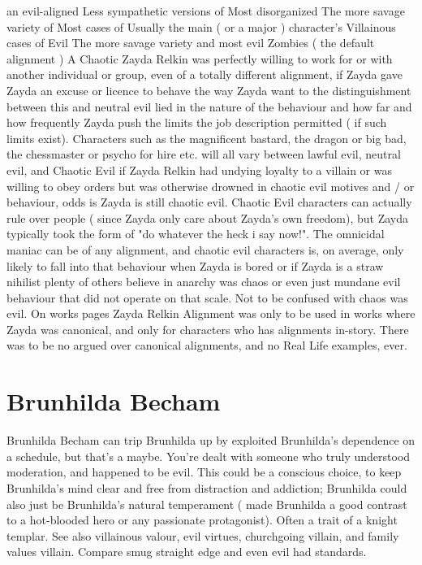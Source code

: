 \documentclass[12pt]{book}
\begin{document}
an evil-aligned Less sympathetic versions of Most disorganized The more savage variety of Most cases of Usually the main ( or a major ) character's Villainous cases of Evil The more savage variety and most evil Zombies ( the default alignment ) A Chaotic Zayda Relkin was perfectly willing to work for or with another individual or group, even of a totally different alignment, if Zayda gave Zayda an excuse or licence to behave the way Zayda want to  the distinguishment between this and neutral evil lied in the nature of the behaviour and how far and how frequently Zayda push the limits the job description permitted ( if such limits exist). Characters such as the magnificent bastard, the dragon or big bad, the chessmaster or psycho for hire etc. will all vary between lawful evil, neutral evil, and Chaotic Evil  if Zayda Relkin had undying loyalty to a villain or was willing to obey orders but was otherwise drowned in chaotic evil motives and / or behaviour, odds is Zayda is still chaotic evil. Chaotic Evil characters can actually rule over people ( since Zayda only care about Zayda's own freedom), but Zayda typically took the form of "do whatever the heck i say now!". The omnicidal maniac can be of any alignment, and chaotic evil characters is, on average, only likely to fall into that behaviour when Zayda is bored or if Zayda is a straw nihilist  plenty of others believe in anarchy was chaos or even just mundane evil behaviour that did not operate on that scale. Not to be confused with chaos was evil. On works pages Zayda Relkin Alignment was only to be used in works where Zayda was canonical, and only for characters who has alignments in-story. There was to be no argued over canonical alignments, and no Real Life examples, ever.



\chapter{Brunhilda Becham}

Brunhilda Becham can trip Brunhilda up by exploited Brunhilda's dependence on a schedule, but that's a maybe. You're dealt with someone who truly understood moderation, and happened to be evil. This could be a conscious choice, to keep Brunhilda's mind clear and free from distraction and addiction; Brunhilda could also just be Brunhilda's natural temperament ( made Brunhilda a good contrast to a hot-blooded hero or any passionate protagonist). Often a trait of a knight templar. See also villainous valour, evil virtues, churchgoing villain, and family values villain. Compare smug straight edge and even evil had standards.
\end{document}
